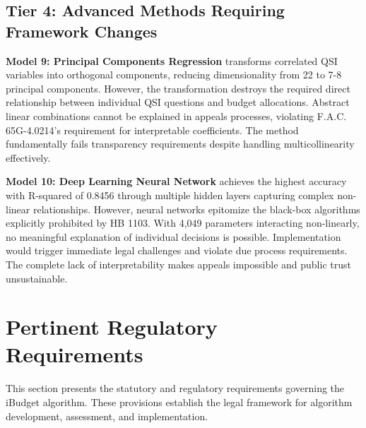 \subsection{Tier 4: Advanced Methods Requiring Framework Changes}

\textbf{Model 9: Principal Components Regression} transforms correlated QSI variables into orthogonal components, reducing dimensionality from 22 to 7-8 principal components. However, the transformation destroys the required direct relationship between individual QSI questions and budget allocations. Abstract linear combinations cannot be explained in appeals processes, violating F.A.C. 65G-4.0214's requirement for interpretable coefficients. The method fundamentally fails transparency requirements despite handling multicollinearity effectively.

\textbf{Model 10: Deep Learning Neural Network} achieves the highest accuracy with R-squared of 0.8456 through multiple hidden layers capturing complex non-linear relationships. However, neural networks epitomize the black-box algorithms explicitly prohibited by HB 1103. With 4,049 parameters interacting non-linearly, no meaningful explanation of individual decisions is possible. Implementation would trigger immediate legal challenges and violate due process requirements. The complete lack of interpretability makes appeals impossible and public trust unsustainable.


\section{Pertinent Regulatory Requirements}

This section presents the statutory and regulatory requirements governing the iBudget algorithm. These provisions establish the legal framework for algorithm development, assessment, and implementation.

